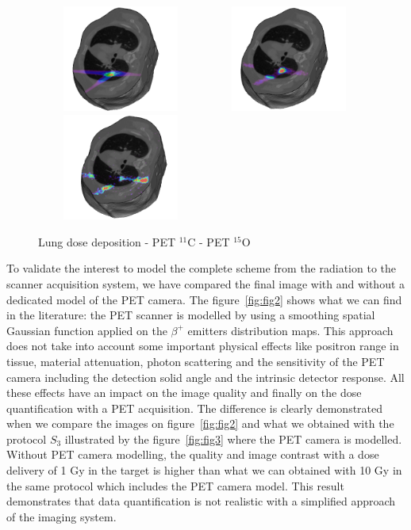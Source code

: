 \documentclass[11pt]{iopart}
\begin{document}
\begin{figure}[!h]
\centering
\includegraphics[width=55mm,height=35mm]{figures/3D-Dose_poumon.jpg}
\includegraphics[width=55mm,height=35mm]{figures/3D-PETC11_poumon.jpg}
\includegraphics[width=55mm,height=35mm]{figures/3D-PETO15_poumon.jpg}
\caption{Lung dose deposition - PET $^{11}$C - PET $^{15}$O}

\label{fig:fig1}
\end{figure}

To validate the interest to model the complete scheme from the radiation to the scanner acquisition system, we have compared the final image with and without a dedicated model of the PET camera. The figure~\ref{fig:fig2} shows what we can find in the literature: the PET scanner is modelled by using a smoothing spatial Gaussian function applied on the $\beta^{+}$ emitters distribution maps. This approach does not take into account some important physical effects like positron range in tissue, material attenuation, photon scattering and the sensitivity of the PET camera including the detection solid angle and the intrinsic detector response. All these effects have an impact on the image quality and finally on the dose quantification with a PET acquisition. The difference is clearly demonstrated when we compare the images on figure~\ref{fig:fig2} and what we obtained with the protocol $S_{3}$ illustrated by the figure~\ref{fig:fig3} where the PET camera is modelled. Without PET camera modelling, the quality and image contrast with a dose delivery of 1 Gy in the target is higher than what we can obtained with 10 Gy in the same protocol which includes the PET camera model. This result demonstrates that data quantification is not realistic with a simplified approach of the imaging system.
\end{document}
